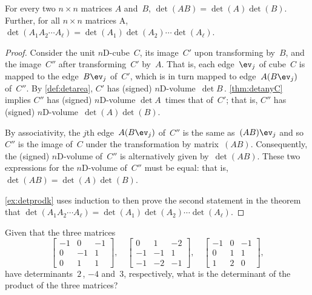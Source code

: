 \begin{theorem} \label{thm:detprod} 
For every two \(n\times n\) matrices \(A\) and~\(B\), \(\det(AB)=\det(A)\det(B)\).
Further, for all \(n\times n\) matrices \hlist A\ell, \(\det(A_1A_2\cdots A_\ell)=\det(A_1)\det(A_2)\cdots\det(A_\ell)\).
\end{theorem}


\begin{proof}  
Consider the unit $n$D-cube~\(C\),  its image~\(C'\) upon transforming by~\(B\), and the image~\(C''\) after transforming~\(C'\) by~\(A\). 
That is, each edge~\(\ev_j\) of cube~\(C\) is mapped to the edge~\(B\ev_j\) of~\(C'\), which is in turn mapped to edge~\(A(B\ev_j)\) of~\(C''\). 
By \cref{def:detarea}, \(C'\) has (signed) $n$D-volume~\(\det B\)\,.
\cref{thm:detanyC} implies \(C''\) has (signed) $n$D-volume \(\det A\)~times that of~\(C'\); that is, \(C''\) has (signed) $n$D-volume~\(\det(A)\det(B)\).  

By associativity, the \(j\)th edge~\(A(B\ev_j)\) of~\(C''\) is the same as~\((AB)\ev_j\) and so \(C''\) is the image of~\(C\) under the transformation by matrix~\((AB)\).
Consequently, the (signed) $n$D-volume of~\(C''\) is alternatively given by~\(\det(AB)\).
These two expressions for the $n$D-volume of~\(C''\) must be equal: that is, \(\det(AB)=\det(A)\det(B)\).

\cref{ex:detprodk} uses induction to then prove the second statement in the theorem that \(\det(A_1A_2\cdots A_\ell)=\det(A_1)\det(A_2)\cdots\det(A_\ell)\).
\end{proof}



\begin{activity}
Given that the three matrices
\begin{equation*}
\begin{bmatrix} -1&0&-1
\\0&-1&1
\\0&1&1 \end{bmatrix},\quad
\begin{bmatrix} 0&1&-2
\\-1&-1&1
\\-1&-2&-1 \end{bmatrix},\quad
\begin{bmatrix} -1&0&-1
\\0&1&1
\\1&2&0 \end{bmatrix},
\end{equation*}
have determinants~\(2\)\,, \(-4\) and~\(3\), respectively, what is the determinant of the product of the three matrices?
\end{activity}




